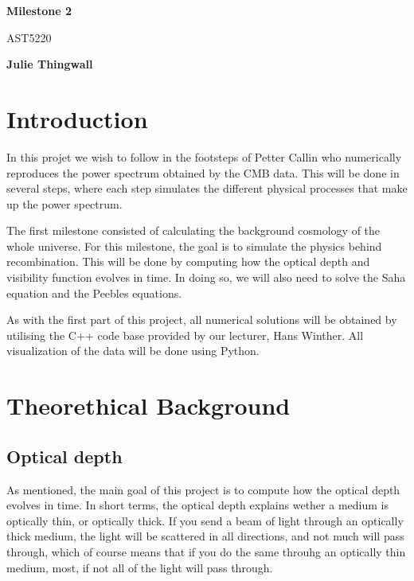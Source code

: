 \documentclass[12pt]{article}
\begin{document}
    \begin{titlepage}
        \begin{center}
            \vspace*{5cm}
            
            \Huge
            \textbf{Milestone 2}
            
            \vspace*{0.5cm}
            \LARGE
            AST5220
        
            \vspace*{0.5cm}
        
            \textbf{Julie Thingwall}
        \end{center}
    \end{titlepage}

\section{Introduction}
In this projet we wish to follow in the footsteps of Petter Callin\cite{callin2006calculate} who numerically reproduces the power spectrum obtained by the CMB data. This will be done in several steps, where each step simulates the different physical processes that make up the power spectrum.

The first milestone consisted of calculating the background cosmology of the whole universe. For this milestone, the goal is to simulate the physics behind recombination. This will be done by computing how the optical depth and visibility function evolves in time. In doing so, we will also need to solve the Saha equation and the Peebles equations.

As with the first part of this project, all numerical solutions will be obtained by utilising the C++ code base provided by our lecturer, Hans Winther. All visualization of the data will be done using Python.

\section{Theorethical Background}
\subsection{Optical depth}
As mentioned, the main goal of this project is to compute how the optical depth evolves in time. In short terms, the optical depth explains wether a medium is optically thin, or optically thick. If you send a beam of light through an optically thick medium, the light will be scattered in all directions, and not much will pass through, which of course means that if you do the same throuhg an optically thin medium, most, if not all of the light will pass through. 
\end{document}
